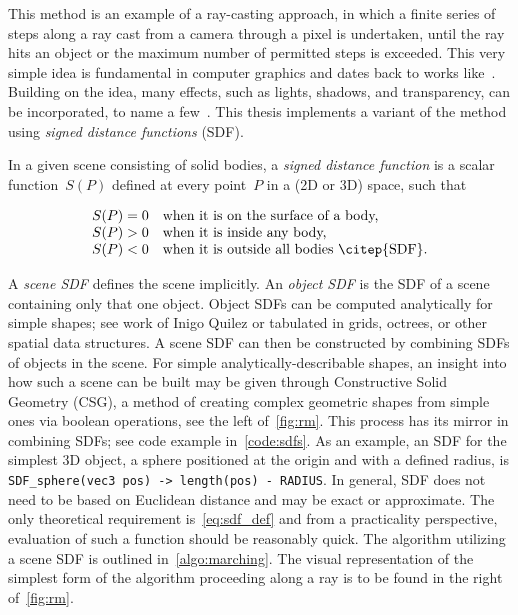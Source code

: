 This method is an example of a ray-casting approach, in which a finite series of steps along
a ray cast from a camera through a pixel is undertaken, until the ray hits an object or
the maximum number of permitted steps is exceeded. This very simple idea is fundamental in
computer graphics and dates back to works like~\citet{RayMarching, Hypertexture}. Building
on the idea, many effects, such as lights, shadows, and transparency, can be incorporated, to
name a few~\citep{RealTimeRendering}. This thesis implements a variant of the method using
\emph{signed distance functions} (SDF).

In a given scene consisting of solid bodies, a \emph{signed distance function} is a scalar
function~$S(P)$ defined at every point~$P$ in a (2D or 3D) space, such that

\begin{equation}\label{eq:sdf_def}
\begin{array}{ll}
S(P) = 0 & \text{when it is on the surface of a body,}\\
S(P) > 0 & \text{when it is inside any body,}\\
S(P) < 0 & \text{when it is outside all bodies~\citep{SDF}.}
\end{array}
\end{equation}

A \emph{scene SDF} defines the scene implicitly. An \emph{object SDF} is the SDF of a scene containing
only that one object. Object SDFs can be computed analytically for simple shapes; see
work of Inigo Quilez
or tabulated in grids, octrees, or other spatial data structures. A scene SDF can then be constructed
by combining SDFs of objects in the scene. For simple analytically-describable shapes, an
insight into how such a scene can be built may be given through Constructive
Solid Geometry (CSG), a method of creating complex geometric shapes from simple ones via boolean
operations, see the left of~\cref{fig:rm}. This process has its mirror in combining SDFs; see code example in~\cref{code:sdfs}.
As an example, an SDF for the simplest 3D object, a sphere positioned at the origin and with a defined radius,
is \verb|SDF_sphere(vec3 pos) -> length(pos) - RADIUS|. In general, SDF does not need to be based on Euclidean distance
and may be exact or approximate. The only theoretical requirement is~\cref{eq:sdf_def} and from a practicality perspective,
evaluation of such a function should be reasonably quick.
The algorithm utilizing a scene SDF is outlined in~\cref{algo:marching}. The visual representation of
the simplest form of the algorithm proceeding along a ray is to be found in the right of~\cref{fig:rm}.

